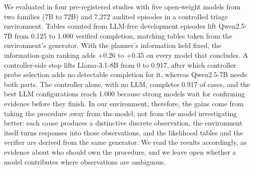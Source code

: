 We evaluated \hesp{} in four pre-registered studies with five open-weight models from two families (7B to 72B) and 7{,}272 audited episodes in a controlled triage environment. Tables counted from LLM-free development episodes lift Qwen2.5-7B from 0.125 to 1.000 verified completion, matching tables taken from the environment's generator. With the planner's information held fixed, the information-gain ranking adds $+0.26$ to $+0.35$ on every model that concludes. A controller-side stop lifts Llama-3.1-8B from 0 to 0.917, after which controller probe selection adds no detectable completion for it, whereas Qwen2.5-7B needs both parts. The controller alone, with no LLM, completes 0.917 of cases, and the best LLM configurations reach 1.000 because strong models wait for confirming evidence before they finish. In our environment, therefore, the gains come from taking the procedure away from the model, not from the model investigating better: each cause produces a distinctive discrete observation, the environment itself turns responses into those observations, and the likelihood tables and the verifier are derived from the same generator. We read the results accordingly, as evidence about who should own the procedure, and we leave open whether a model contributes where observations are ambiguous.

